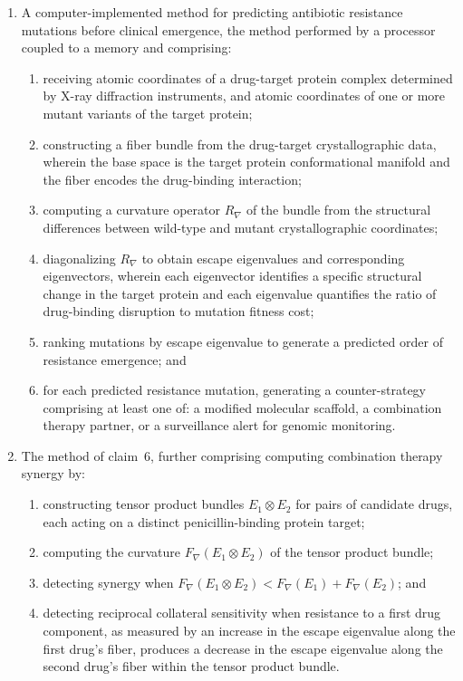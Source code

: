 \documentclass[11pt]{article}
\begin{document}
\begin{enumerate}[label=\textbf{\arabic*.}, leftmargin=*, itemsep=1em]
\item A computer-implemented method for predicting antibiotic resistance mutations before
clinical emergence, the method performed by a processor coupled to a memory and comprising:
\begin{enumerate}[label=(\alph*)]
    \item receiving atomic coordinates of a drug-target protein complex determined by X-ray
    diffraction instruments, and atomic coordinates of one or more mutant variants of the
    target protein;
    \item constructing a fiber bundle from the drug-target crystallographic data, wherein the
    base space is the target protein conformational manifold and the fiber encodes the
    drug-binding interaction;
    \item computing a curvature operator $R_\nabla$ of the bundle from the structural
    differences between wild-type and mutant crystallographic coordinates;
    \item diagonalizing $R_\nabla$ to obtain escape eigenvalues and corresponding eigenvectors,
    wherein each eigenvector identifies a specific structural change in the target protein and
    each eigenvalue quantifies the ratio of drug-binding disruption to mutation fitness cost;
    \item ranking mutations by escape eigenvalue to generate a predicted order of resistance
    emergence; and
    \item for each predicted resistance mutation, generating a counter-strategy comprising at
    least one of: a modified molecular scaffold, a combination therapy partner, or a
    surveillance alert for genomic monitoring.
\end{enumerate}

\item The method of claim~6, further comprising computing combination therapy synergy by:
\begin{enumerate}[label=(\alph*)]
    \item constructing tensor product bundles $E_1 \otimes E_2$ for pairs of candidate drugs,
    each acting on a distinct penicillin-binding protein target;
    \item computing the curvature $F_\nabla(E_1 \otimes E_2)$ of the tensor product bundle;
    \item detecting synergy when $F_\nabla(E_1 \otimes E_2) < F_\nabla(E_1) + F_\nabla(E_2)$;
    and
    \item detecting reciprocal collateral sensitivity when resistance to a first drug component,
    as measured by an increase in the escape eigenvalue along the first drug's fiber, produces
    a decrease in the escape eigenvalue along the second drug's fiber within the tensor product
    bundle.
\end{enumerate}


\end{enumerate}
\end{document}
